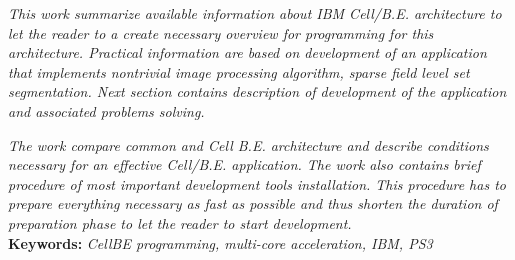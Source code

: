 \par
\noindent
\textit{
This work summarize available information about IBM Cell/B.E. architecture to let the reader to a create necessary overview for programming for this architecture.
Practical information are based on development of an application that implements nontrivial image processing algorithm, sparse field level set segmentation.
Next section contains description of development of the application and associated problems solving.
}\\
\par
\noindent
\textit{
The work compare common and Cell B.E. architecture and describe conditions necessary for an effective Cell/B.E. application.
The work also contains brief procedure of most important development tools installation.
This procedure has to prepare everything necessary as fast as possible and thus shorten the duration of preparation phase to let the reader to start development.
}\\

\noindent
\textbf{Keywords:} \textit{CellBE programming, multi-core acceleration, IBM, PS3}

\pagebreak